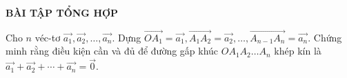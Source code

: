\begin{center}
	\textbf{BÀI TẬP TỔNG HỢP}
\end{center}
\begin{bt}%
	Cho $n$ véc-tơ $\overrightarrow {a_1} ,\overrightarrow {a_2} ,\ldots,\overrightarrow {a_n} $. Dựng $\overrightarrow {OA_1}  = \overrightarrow {a_1} ,\overrightarrow {A_1A_2}  = \overrightarrow {a_2} ,\dots,\overrightarrow {A_{n - 1}A_n}  = \overrightarrow {a_n} $. Chứng minh rằng điều kiện cần và đủ để đường gấp khúc $OA_1A_2\ldots A_n$ khép kín là $\overrightarrow {a_1}  + \overrightarrow {a_2}  + \cdots + \overrightarrow {a_n}  = \overrightarrow 0 $.
\end{bt}


